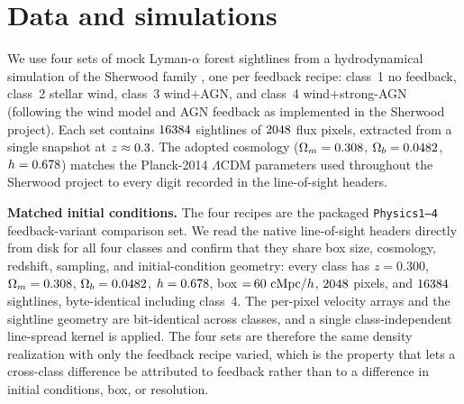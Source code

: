 \section{Data and simulations}
\label{sec:data}

We use four sets of mock Lyman-$\alpha$ forest sightlines from a hydrodynamical
simulation of the Sherwood family \citep{Bolton2017, Nasir2017}, one per
feedback recipe: class~1 no feedback, class~2 stellar wind, class~3
wind${+}$AGN, and class~4 wind${+}$strong-AGN (following the
\citealt{PuchweinSpringel2013} wind model and \citealt{Sijacki2007} AGN
feedback as implemented in the Sherwood project). Each set contains
$16384$ sightlines of $2048$ flux pixels, extracted from a single
snapshot at $z\approx0.3$. The adopted cosmology
($\Omega_m=0.308$, $\Omega_b=0.0482$, $h=0.678$) matches the Planck-2014
$\Lambda$CDM parameters used throughout the Sherwood project
\citep{Planck2014} to every digit recorded in the line-of-sight headers.

\textbf{Matched initial conditions.} The four recipes are the packaged
\texttt{Physics1--4} feedback-variant comparison set. We read the native
line-of-sight headers directly from disk for all four classes and confirm that
they share box size, cosmology, redshift, sampling, and initial-condition
geometry: every class has $z=0.300$, $\Omega_m=0.308$, $\Omega_b=0.0482$,
$h=0.678$, box ${=}\,60~\mathrm{cMpc}/h$, $2048$ pixels, and
$16384$ sightlines, byte-identical including class~4. The per-pixel
velocity arrays and the sightline geometry are bit-identical across classes, and
a single class-independent line-spread kernel is applied. The four sets are
therefore the same density realization with only the feedback recipe varied,
which is the property that lets a cross-class difference be attributed to
feedback rather than to a difference in initial conditions, box, or resolution.

